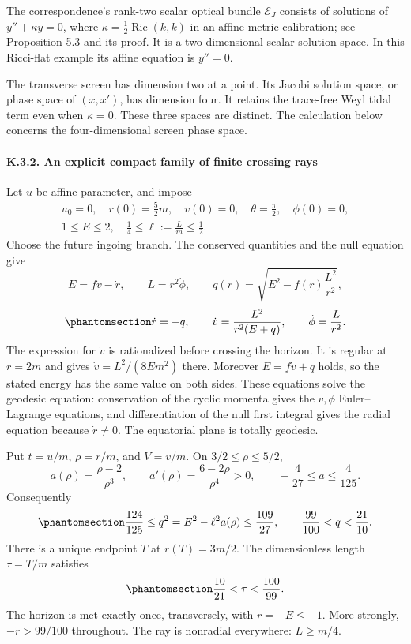 \documentclass[
  english,
  11pt,
  reqno]{amsart}
\begin{document}
The correspondence's rank-two scalar optical bundle \(\mathcal E_J\)
consists of solutions of \(y''+\kappa y=0\), where
\(\kappa=\tfrac12\operatorname{Ric}(k,k)\) in an affine metric
calibration; see Proposition 5.3 and its proof. It is a two-dimensional
scalar solution space. In this Ricci-flat example its affine equation is
\(y''=0\).

The transverse screen has dimension two at a point. Its Jacobi solution
space, or phase space of \((x,x')\), has dimension four. It retains the
trace-free Weyl tidal term even when \(\kappa=0\). These three spaces
are distinct. The calculation below concerns the four-dimensional screen
phase space.

\protect{}\label{sec:sh-optics-2}

\paragraph{K.3.2. An explicit compact family of finite crossing
rays}\label{k.3.2.-an-explicit-compact-family-of-finite-crossing-rays}

Let \(u\) be affine parameter, and impose \[
 \begin{gathered}
u_0=0,\quad r(0)=\frac52m,\quad v(0)=0,\quad
 \theta=\frac\pi2,\quad \phi(0)=0, \\
1\le E\le2,\quad \frac14\le\ell:=\frac Lm\le\frac12.
\end{gathered}
\] Choose the future ingoing branch. The conserved quantities and the
null equation give \[
 E=f\dot v-\dot r,\qquad L=r^2\dot\phi,\qquad
 q(r)=\sqrt{E^2-f(r)\frac{L^2}{r^2}},
\] \begin{equation}\protect\phantomsection\label{eq:sh-optics-d-1}{
 \dot r=-q,\qquad
 \dot v=\frac{L^2}{r^2(E+q)},\qquad
 \dot\phi=\frac L{r^2}.
}\end{equation} The expression for \(\dot v\) is rationalized before
crossing the horizon. It is regular at \(r=2m\) and gives
\(\dot v=L^2/(8Em^2)\) there. Moreover \(E=f\dot v+q\) holds, so the
stated energy has the same value on both sides. These equations solve
the geodesic equation: conservation of the cyclic momenta gives the
\(v,\phi\) Euler--Lagrange equations, and differentiation of the null
first integral gives the radial equation because \(\dot r\ne0\). The
equatorial plane is totally geodesic.

Put \(t=u/m\), \(\rho=r/m\), and \(V=v/m\). On \(3/2\le\rho\le5/2\), \[
 a(\rho)=\frac{\rho-2}{\rho^3},\qquad
 a'(\rho)=\frac{6-2\rho}{\rho^4}>0,\qquad
 -\frac4{27}\le a\le\frac4{125}.
\] Consequently
\begin{equation}\protect\phantomsection\label{eq:sh-optics-d-2}{
 \frac{124}{125}\le q^2=E^2-\ell^2a(\rho)\le\frac{109}{27},
 \qquad \frac{99}{100}<q<\frac{21}{10}.
}\end{equation} There is a unique endpoint \(T\) at \(r(T)=3m/2\). The
dimensionless length \(\tau=T/m\) satisfies
\begin{equation}\protect\phantomsection\label{eq:sh-optics-d-3}{
 \frac{10}{21}<\tau<\frac{100}{99}.
}\end{equation} The horizon is met exactly once, transversely, with
\(\dot r=-E\le-1\). More strongly, \(-\dot r>99/100\) throughout. The
ray is nonradial everywhere: \(L\ge m/4\).
\end{document}
